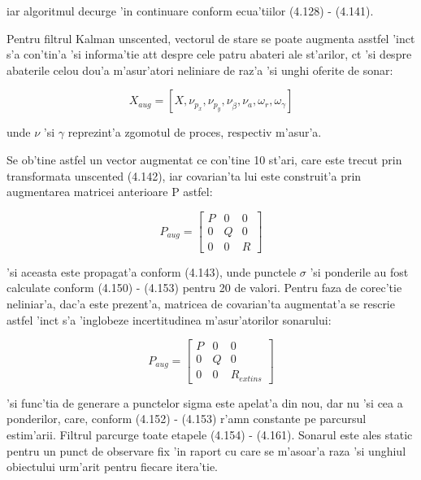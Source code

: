 \documentclass[12pt,a4paper,twoside]{report}
\begin{document}
iar algoritmul decurge 'in continuare conform ecua'tiilor (4.128) - (4.141). 

\vspace{5px}

Pentru filtrul Kalman unscented, vectorul de stare se poate augmenta asstfel 'inc\ia t s'a con'tin'a 'si informa'tie at\ia t despre cele patru abateri ale st'arilor, c\ia t 'si despre abaterile celou dou'a m'asur'atori neliniare de raz'a 'si unghi oferite de sonar:

\begin{equation}
    X_{aug} =  [X, \nu_{p_x}, \nu_{p_y}, \nu_{\dot \beta}, \nu_{a}, \omega_r, \omega_\gamma]
\end{equation}

unde $\nu$ 'si $\gamma$ reprezint'a zgomotul de proces, respectiv m'asur'a. 

\vspace{5px}

Se ob'tine astfel un vector augmentat ce con'tine 10 st'ari, care este trecut prin transformata unscented (4.142), iar covarian'ta lui este construit'a prin augmentarea matricei anterioare P astfel: 

\begin{equation}
    P_{aug} = \begin{bmatrix}
    P & 0 & 0 \\ 0 & Q & 0 \\ 0 & 0 & R
    \end{bmatrix}
\end{equation}

'si aceasta este propagat'a conform (4.143), unde punctele $\sigma$ 'si ponderile au fost calculate conform (4.150) - (4.153) pentru 20 de valori. Pentru faza de corec'tie neliniar'a, dac'a este prezent'a, matricea de covarian'ta augmentat'a se rescrie astfel 'inc\ia t s'a 'inglobeze incertitudinea m'asur'atorilor sonarului: 

\begin{equation}
    P_{aug} = \begin{bmatrix}
    P & 0 & 0 \\ 0 & Q & 0 \\ 0 & 0 & R_{extins}
    \end{bmatrix}
\end{equation}

'si func'tia de generare a punctelor sigma este apelat'a din nou, dar nu 'si cea a ponderilor, care, conform (4.152) - (4.153) r'am\ia n constante pe parcursul estim'arii. Filtrul parcurge toate etapele (4.154) - (4.161). Sonarul este ales static pentru un punct de observare fix 'in raport cu care se m'asoar'a raza 'si unghiul obiectului urm'arit pentru fiecare itera'tie.
\end{document}
